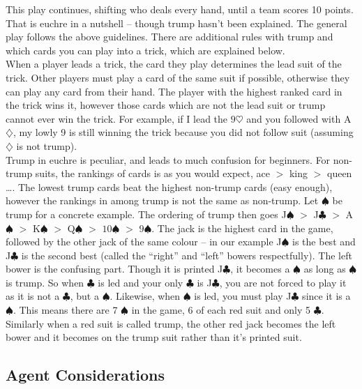 This play continues, shifting who deals every hand, until a team scores 10 points. That is euchre in a nutshell -- though trump hasn't been explained.
The general play follows the above guidelines. There are additional rules with trump and which cards you can play into a trick, which are explained below.
\\
When a player leads a trick, the card they play determines the lead suit of the trick. Other players must play a card of the same suit
if possible, otherwise they can play any card from their hand. The player with the highest ranked card in the trick wins it, however those cards
which are not the lead suit or trump cannot ever win the trick. For example, if I lead the $9\heartsuit$ and you followed with A$\diamondsuit$, my
lowly 9 is still winning the trick because you did not follow suit (assuming $\diamondsuit$ is not trump).
\\
Trump in euchre is peculiar, and leads to much confusion for beginners. For non-trump suits, the rankings of cards is as you would expect, ace $>$
king $>$ queen \ldots. The lowest trump cards beat the highest non-trump cards (easy enough), however the rankings in among trump is not the same as
non-trump. Let $\spadesuit$ be trump for a concrete example. The ordering of trump then goes
J$\spadesuit$ $>$ J$\clubsuit$ $>$ A$\spadesuit$ $>$ K$\spadesuit$ $>$ Q$\spadesuit$ $>$ $10\spadesuit$ $>$ $9\spadesuit$.
The jack is the highest card in the game, followed by the other jack of the same colour -- in our example J$\spadesuit$ is the best and J$\clubsuit$
is the second best (called the ``right'' and ``left'' bowers respectfully). The left bower is the confusing part. Though it is printed J$\clubsuit$, it
becomes a $\spadesuit$ as long as $\spadesuit$ is trump. So when $\clubsuit$ is led and your only $\clubsuit$ is J$\clubsuit$, you are not forced
to play it as it is not a $\clubsuit$, but a $\spadesuit$. Likewise, when $\spadesuit$ is led, you must play J$\clubsuit$ since it is a $\spadesuit$.
This means there are 7 $\spadesuit$ in the game, 6 of each red suit and only 5 $\clubsuit$.
Similarly when a red suit is called trump, the other red jack becomes the left bower and it becomes on the trump suit rather than it's printed suit.


\subsection{Agent Considerations}

